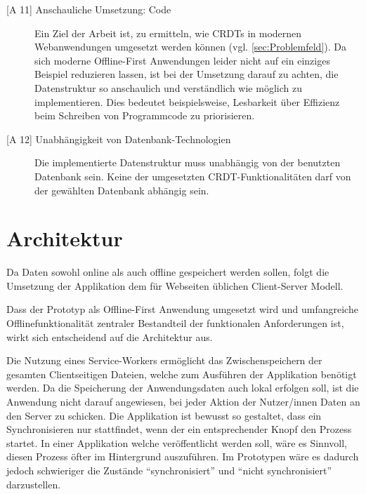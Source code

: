 \documentclass[a4paper, 12pt]{scrreprt}
\begin{document}
\begin{description}
	\item[{[A 11]} Anschauliche Umsetzung: Code]
	Ein Ziel der Arbeit ist, zu ermitteln, wie \acp{CRDT} in modernen Webanwendungen umgesetzt werden können (vgl. \ref{sec:Problemfeld}). Da sich moderne Offline-First Anwendungen leider nicht auf ein einziges Beispiel reduzieren lassen, ist bei der Umsetzung darauf zu achten, die Datenstruktur so anschaulich und verständlich wie möglich zu implementieren. Dies bedeutet beispielsweise, Lesbarkeit über Effizienz beim Schreiben von Programmcode zu priorisieren.
	\item[{[A 12]} Unabhängigkeit von Datenbank-Technologien]
	Die implementierte Datenstruktur muss unabhängig von der benutzten Datenbank sein. Keine der umgesetzten CRDT-Funktionalitäten darf von der gewählten Datenbank abhängig sein.
\end{description}

\section{Architektur}
\label{sec:Architektur}

Da Daten sowohl online als auch offline gespeichert werden sollen, folgt die Umsetzung der Applikation dem für Webseiten üblichen Client-Server Modell. 

Dass der Prototyp als Offline-First Anwendung umgesetzt wird und umfangreiche Offlinefunktionalität zentraler Bestandteil der funktionalen Anforderungen ist, wirkt sich entscheidend auf die Architektur aus.

Die Nutzung eines Service-Workers ermöglicht das Zwischenspeichern der gesamten Clientseitigen Dateien, welche zum Ausführen der Applikation benötigt werden. Da die Speicherung der Anwendungsdaten auch lokal erfolgen soll, ist die Anwendung nicht darauf angewiesen, bei jeder Aktion der Nutzer/innen Daten an den Server zu schicken. Die Applikation ist bewusst so gestaltet, dass ein Synchronisieren nur stattfindet, wenn der ein entsprechender Knopf den Prozess startet. In einer Applikation welche veröffentlicht werden soll, wäre es Sinnvoll, diesen Prozess öfter im Hintergrund auszuführen. Im Prototypen wäre es dadurch jedoch schwieriger die Zustände \enquote{synchronisiert} und \enquote {nicht synchronisiert} darzustellen. 
\end{document}
